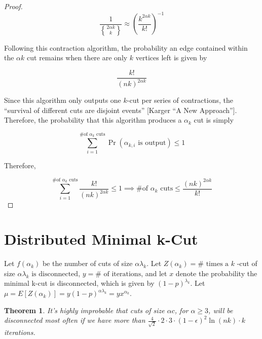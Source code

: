 \documentclass{acm_proc_article-sp}
\newtheorem{theorem}{Theorem}
\DeclareRobustCommand{\stirling}{\genfrac\{\}{0pt}{}}
\begin{document}
\begin{proof}
\[
\frac{1}{ \stirling{2 \alpha k }{k} } \approx \left( \frac{k^{2 \alpha k}}{k!} \right)^{-1}
\]

Following this contraction algorithm, the probability an edge contained within the $\alpha k$ cut remains when there are only $k$ vertices left is given by

\[
\frac{k!}{(nk)^{2 \alpha k}}
\]

Since this algorithm only outputs one $k$-cut per series of contractions, the ``survival of different cuts are disjoint events'' [Karger ``A New Approach'']. Therefore, the probability that this algorithm produces a $\alpha_k$ cut is simply

\[
\sum_{i=1}^{\text{\# of } \alpha_k \text{ cuts}} \Pr(\alpha_{k,i} \text{ is output}) \leq 1
\]

Therefore, 

\[
\sum_{i=1}^{\text{\# of } \alpha_k \text{ cuts}} \frac{k!}{(nk)^{2 \alpha k}} \leq 1 \implies \text{\# of } \alpha_k \text{ cuts} \leq \frac{(nk)^{2 \alpha k}}{k!}
\]

\end{proof}



\section{Distributed Minimal k-Cut}

Let $f(\alpha_k)$ be the number of cuts of size $\alpha \lambda_k$. Let $Z(\alpha_k) = \# \text{ times a } k$ -cut of size 
$\alpha \lambda_k \text{ is disconnected}$, $y = \# \text{ of iterations}$, and let $x$ denote the probability the minimal k-cut is disconnected, which is given by $(1 - p)^{\lambda_k}$. Let $\mu = E[Z(\alpha_k)] = y(1-p)^{\alpha \lambda_k} = yx^{\alpha_k}$.

\begin{theorem} It's highly improbable that cuts of size $\alpha c$, for $\alpha \geq 3$, will be disconnected most often if we have more than $\frac{4}{\sqrt{2}} \cdot 2 \cdot 3 \cdot (1-\epsilon)^2 \ln{(nk)} \cdot k$ iterations.
\end{theorem}
\end{document}
